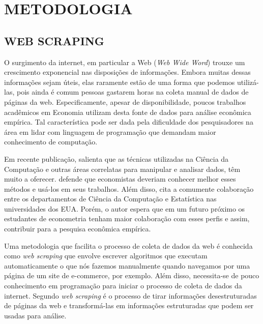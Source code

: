 \documentclass[twoside,a4paper,11pt]{report}
\begin{document}
\chapter{METODOLOGIA}\label{cap3}

\section*{WEB SCRAPING}

O surgimento da internet, em particular a Web (\emph{Web Wide Word}) trouxe um crescimento exponencial nas disposições de informações. Embora muitas dessas informações sejam úteis, elas raramente estão de uma forma que podemos utilizá-las, pois ainda é comum pessoas gastarem horas na coleta manual de dados de páginas da web. Especificamente, apesar de disponibilidade, poucos trabalhos acadêmicos em Economia utilizam desta fonte de dados para análise econômica empírica. Tal característica pode ser dada pela dificuldade dos pesquisadores na área em lidar com linguagem de programação que demandam maior conhecimento de computação. 

Em recente publicação, \citet{varian2014big} salienta que as técnicas utilizadas na Ciência da Computação e outras áreas correlatas para manipular e analisar dados, têm muito a oferecer. \citet{varian2014big} defende que economistas deveriam conhecer melhor esses métodos e usá-los em seus trabalhos. Além disso, \citet{varian2014big} cita a comumente colaboração entre os departamentos de Ciência da Computação e Estatística nas universidades dos EUA. Porém, o autor espera que em um futuro próximo os estudantes de econometria tenham maior colaboração com esses perfis e assim, contribuir para a pesquisa econômica empírica.

Uma metodologia que facilita o processo de coleta de dados da web é conhecida como \emph{web scraping} que envolve escrever algoritmos que executam automaticamente o que nós fazemos manualmente quando navegamos por uma página de um site de e-commerce, por exemplo. Além disso, necessita-se de pouco conhecimento em programação para iniciar o processo de coleta de dados da internet. Segundo \citet{manning2008introduction} \emph{web scraping} é o processo de tirar informações desestruturadas de páginas da web e transformá-las em informações estruturadas que podem ser usadas para análise. 
\end{document}
